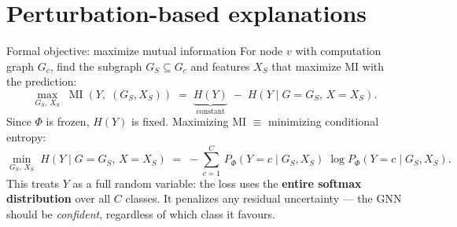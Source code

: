 \documentclass[xcolor=svgnames,aspectratio=169]{beamer}
\begin{document}
\section{Perturbation-based explanations}

\begin{frame}{Formal objective: maximize mutual information}
    For node $v$ with computation graph $G_c$, find the subgraph $G_S \subseteq G_c$ and features $X_S$ that maximize MI with the prediction:
    \begin{equation}
        \max_{G_S,\, X_S} \;\operatorname{MI}\!\left(Y,\; (G_S, X_S)\right) \;=\; \underbrace{H(Y)}_{\text{constant}} \;-\; H(Y \mid G\!=\!G_S,\, X\!=\!X_S).
    \end{equation}
    Since $\Phi$ is frozen, $H(Y)$ is fixed.  Maximizing MI $\equiv$ minimizing conditional entropy:
    \begin{equation}
        \label{eq:cond_entropy}
        \min_{G_S,\, X_S} \; H(Y \mid G\!=\!G_S,\, X\!=\!X_S) \;=\; -\sum_{c=1}^{C}\, P_\Phi(Y\!=\!c \mid G_S, X_S)\;\log P_\Phi(Y\!=\!c \mid G_S, X_S).
    \end{equation}
    This treats $Y$ as a full random variable: the loss uses the \textbf{entire softmax distribution} over all $C$ classes.  It penalizes any residual uncertainty --- the GNN should be \emph{confident}, regardless of which class it favours.
\end{frame}
\end{document}
